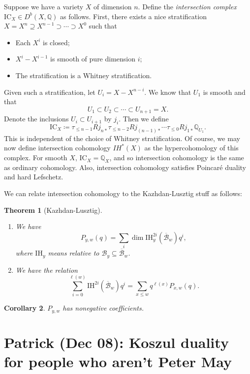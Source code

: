\documentclass[leqno, openany]{memoir}
\newtheorem{thm}{Theorem}[section]
\newtheorem{cor}[thm]{Corollary}
\theoremstyle{definition}
\theoremstyle{remark}
\theoremstyle{plain}
\theoremstyle{definition}
\theoremstyle{remark}
\newcommand{\Q}{\mathbb{Q}}
\newcommand{\mc}[1]{\mathcal{#1}}
\newcommand{\mr}[1]{\mathrm{#1}}
\newcommand{\ol}[1]{\overline{#1}}
\begin{document}
Suppose we have a variety $X$ of dimension $n$. Define the \textit{intersection complex} $\mr{IC}_X \in D^b(X, \Q)$ as follows. First, there exists a nice stratification $X = X^n \supseteq X^{n-1} \supset \cdots \supset X^0$ such that
\begin{itemize}
    \item Each $X^i$ is closed;
    \item $X^i - X^{i-1}$ is smooth of pure dimension $i$;
    \item The stratification is a Whitney stratification.
\end{itemize}
Given such a stratification, let $U_i = X - X^{n-i}$. We know that $U_1$ is smooth and that
\[ U_1 \subset U_2 \subset \cdots \subset U_{n+1} = X. \]
Denote the inclusions $U_i \subset U_{i+1}$ by $j_i$. Then we define
\[ \mr{IC}_X \coloneqq \tau_{\leq n-1} R j_{n*} \tau_{\leq n-2} R j_{(n-1)*} \cdots \tau_{\leq 0} R j_{1*} \Q_{U_1}. \]
This is independent of the choice of Whitney stratification. Of course, we may now define intersection cohomology $IH^*(X)$ as the hypercohomology of this complex. For smooth $X$, $\mr{IC}_X = \Q_X$, and so intersection cohomology is the same as ordinary cohomology. Also, intersection cohomology satisfies Poincar\'e duality and hard Lefschetz.

We can relate intersection cohomology to the Kazhdan-Lusztig stuff as follows:
\begin{thm}[Kazhdan-Lusztig]
    \begin{enumerate}
        \item We have 
            \[ P_{y,w}(q) = \sum_i \dim \mr{IH}_y^{2i}(\ol{\mc{B}}_w) q^i, \]
            where $\mr{IH}_y$ means relative to $\mc{B}_y \subseteq \ol{\mc{B}}_w$.
        \item We have the relation
            \[ \sum_{i=0}^{\ell(w)} \mr{IH}^{2i}(\ol{\mc{B}}_w) q^i = \sum_{x \leq w} q^{\ell(x)} P_{x,w}(q). \]
    \end{enumerate}
\end{thm}

\begin{cor}
    $P_{y,w}$ has nonegative coefficients.
\end{cor}

\chapter{Patrick (Dec 08): Koszul duality for people who aren't Peter May}%
\label{cha:patrick_dec_08_koszul_duality_for_people_who_aren_t_peter_may}
\end{document}
